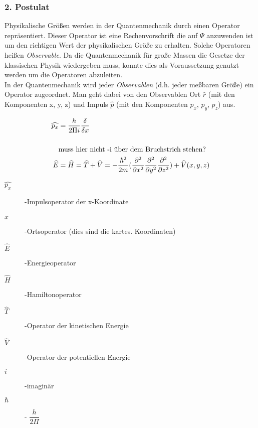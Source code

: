 \documentclass[12pt,a4paper,oneside,normalheadings,abstracton,liststotoc,bibtotoc,titlepage,pdftex]{scrartcl}
\begin{document}
\subsubsection*{2. Postulat}
Physikalische Größen werden in der Quantenmechanik durch einen Operator repräsentiert. Dieser Operator ist eine Rechenvorschrift die auf $\Psi$ anzuwenden ist um den richtigen Wert der physikalischen Größe zu erhalten. Solche Operatoren heißen \textit{Observable}. Da die Quantenmechanik für große Massen die Gesetze der klassischen Physik wiedergeben muss, konnte dies als Voraussetzung genutzt werden um die Operatoren abzuleiten.\\
In der Quantenmechanik wird jeder \textit{Observablen} (d.h. jeder meßbaren Größe) ein Operator
zugeordnet. Man geht dabei von den Observablen Ort $\widehat{r}$ (mit den Komponenten x, y, z)
und Impuls $\widehat{p}$ (mit den Komponenten $p_x$, $p_y$, $p_z$) aus.

\begin{align}
\widehat{p_x} &= \dfrac{h}{2\Pi i} \dfrac{\delta}{\delta x}\\\\
\notag & \text{muss hier nicht -i über dem Bruchstrich stehen?}\\
\widehat{E} &= \widehat{H} = \widehat{T} + \widehat{V} = - \dfrac{\hbar^2}{2m}(\dfrac{\partial^2}{\partial x^2}\dfrac{\partial^2}{\partial y^2}\dfrac{\partial^2}{\partial z^2})+\widehat{V}(x,y,z)
\end{align}
\begin{description}
\item[$\widehat{p_x}$]-Impulsoperator der x-Koordinate
\item[$\widehat{x}$]-Ortsoperator (dies sind die kartes. Koordinaten)
\item[$\widehat{E}$]-Energieoperator
\item[$\widehat{H}$]-Hamiltonoperator
\item[$\widehat{T}$]-Operator der kinetischen Energie
\item[$\widehat{V}$]-Operator der potentiellen Energie
\item[$i$]-imaginär
\item[$\hbar$]- $\dfrac{h}{2\Pi}$
\end{description}
\end{document}
